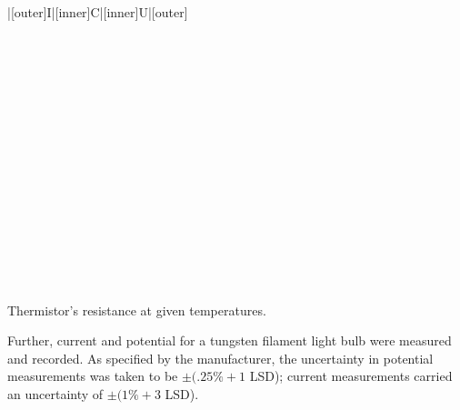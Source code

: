 \begin{paper}
{\begin{papertable}{|[outer]I|[inner]C|[inner]U|[outer]}
			\papertableindex{}\\\paperiline
			\papertableindex{}\\\paperiline
			\papertableindex{}\\\paperiline
			\papertableindex{}\\\paperiline
			\papertableindex{}\\\paperiline
			\papertableindex{}\\\paperiline
			\papertableindex{}\\\paperiline
			\papertableindex{}\\\paperiline
			\papertableindex{}\\\paperiline
			\papertableindex{}\\\paperiline
			\papertableindex{}\\\paperiline
			\papertableindex{}\\\paperiline
			\papertableindex{}\\\paperiline
			\papertableindex{}\\\paperiline
			\papertableindex{}\\\paperiline
			\papertableindex{}\\\paperoline
		\end{papertable}\vspace{-1.5em}}
	{Thermistor's resistance at given temperatures. }\vspace{0.5em}
	
	Further, current and potential for a tungsten filament light bulb were measured and recorded. As specified by the manufacturer, the uncertainty in potential measurements was taken to be \( \pm (.25\% + 1 \) LSD); current measurements carried an uncertainty of \( \pm (1\% + 3 \) LSD). \vspace{0.5em}


\end{paper}
